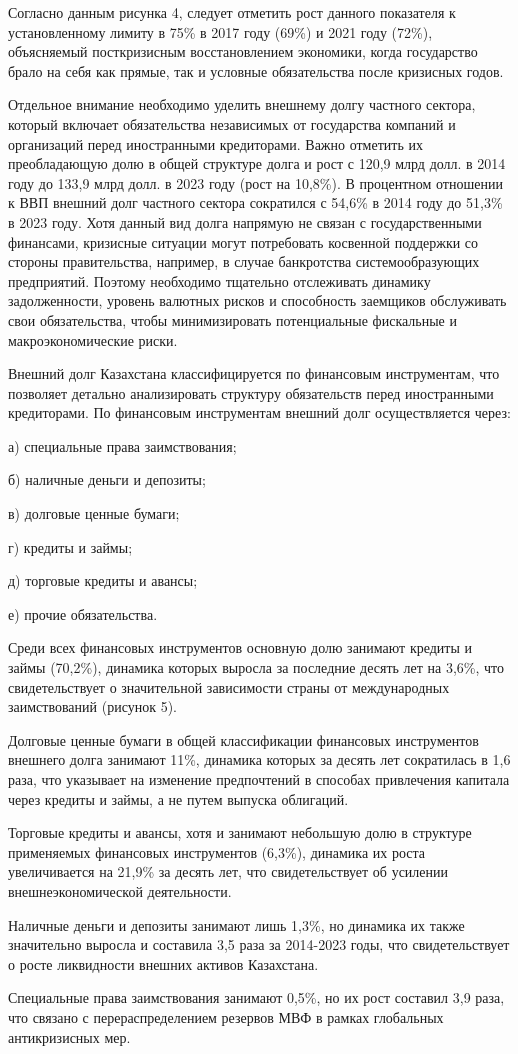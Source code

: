 \begin{multicols}{2}
Согласно данным рисунка 4, следует отметить рост данного показателя к
установленному лимиту в 75\% в 2017 году (69\%) и 2021 году (72\%),
объясняемый посткризисным восстановлением экономики, когда государство
брало на себя как прямые, так и условные обязательства после кризисных
годов.

Отдельное внимание необходимо уделить внешнему долгу частного сектора,
который включает обязательства независимых от государства компаний и
организаций перед иностранными кредиторами. Важно отметить их
преобладающую долю в общей структуре долга и рост с 120,9 млрд долл. в
2014 году до 133,9 млрд долл. в 2023 году (рост на 10,8\%). В процентном
отношении к ВВП внешний долг частного сектора сократился с 54,6\% в 2014
году до 51,3\% в 2023 году. Хотя данный вид долга напрямую не связан с
государственными финансами, кризисные ситуации могут потребовать
косвенной поддержки со стороны правительства, например, в случае
банкротства системообразующих предприятий. Поэтому необходимо тщательно
отслеживать динамику задолженности, уровень валютных рисков и
способность заемщиков обслуживать свои обязательства, чтобы
минимизировать потенциальные фискальные и макроэкономические риски.

Внешний долг Казахстана классифицируется по финансовым инструментам, что
позволяет детально анализировать структуру обязательств перед
иностранными кредиторами. По финансовым инструментам внешний долг
осуществляется через:

а) специальные права заимствования;

б) наличные деньги и депозиты;

в) долговые ценные бумаги;

г) кредиты и займы;

д) торговые кредиты и авансы;

е) прочие обязательства.

Среди всех финансовых инструментов основную долю занимают кредиты и
займы (70,2\%), динамика которых выросла за последние десять лет на
3,6\%, что свидетельствует о значительной зависимости страны от
международных заимствований (рисунок 5).

Долговые ценные бумаги в общей классификации финансовых инструментов
внешнего долга занимают 11\%, динамика которых за десять лет сократилась
в 1,6 раза, что указывает на изменение предпочтений в способах
привлечения капитала через кредиты и займы, а не путем выпуска
облигаций.

Торговые кредиты и авансы, хотя и занимают небольшую долю в структуре
применяемых финансовых инструментов (6,3\%), динамика их роста
увеличивается на 21,9\% за десять лет, что свидетельствует об усилении
внешнеэкономической деятельности.

Наличные деньги и депозиты занимают лишь 1,3\%, но динамика их также
значительно выросла и составила 3,5 раза за 2014-2023 годы, что
свидетельствует о росте ликвидности внешних активов Казахстана.

Специальные права заимствования занимают 0,5\%, но их рост составил 3,9
раза, что связано с перераспределением резервов МВФ в рамках глобальных
антикризисных мер.
\end{multicols}

